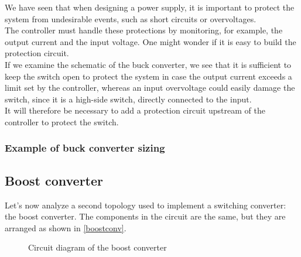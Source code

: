 \documentclass[../main.tex]{subfiles}
\begin{document}
We have seen that when designing a power supply, it is important to protect the
system from undesirable events, such as short circuits or overvoltages.\\

The controller must handle these protections by monitoring, for example, the output current and the input voltage. One might wonder if it is easy to build the protection circuit.\\

If we examine the schematic of the buck converter, we see that it is sufficient to keep the switch open to protect the system in case the output current exceeds a limit set by the controller, whereas an input overvoltage could easily damage the switch, since it is a high-side switch, directly connected to the input.\\

It will therefore be necessary to add a protection circuit upstream of the controller to protect the switch.



\subsubsection{Example of buck converter sizing} %




\subsection{Boost converter}


Let’s now analyze a second topology used to implement a switching converter: the boost converter. The components in the circuit are the same, but they are arranged as shown in \autoref{boostconv}.

\begin{figure}[h!]
\begin{center}



\label{boostconv}
\caption{Circuit diagram of the boost converter}	
\end{center}
\end{figure}
\end{document}
